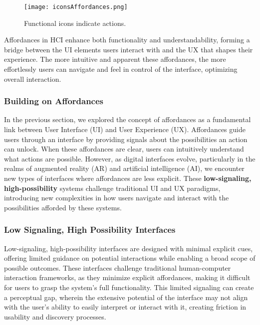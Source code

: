 \begin{figure}[h]
    \centering
    \texttt{[image: iconsAffordances.png]}
    \caption{Functional icons indicate actions.}
    \vspace{0.1cm}
    \label{fig:affordances}
\end{figure}

Affordances in HCI enhance both functionality and understandability, forming a bridge between the UI elements users interact with and the UX that shapes their experience.
The more intuitive and apparent these affordances, the more effortlessly users can navigate and feel in control of the interface, optimizing overall interaction.

\subsubsection{Building on Affordances}

In the previous section, we explored the concept of affordances as a fundamental link between User Interface (UI) and User Experience (UX).
Affordances guide users through an interface by providing signals about the possibilities an action can unlock\cite{10.20380/gi2000.24}\cite{10.1177/1086026618803729}.
When these affordances are clear, users can intuitively understand what actions are possible.
However, as digital interfaces evolve, particularly in the realms of augmented reality (AR) and artificial intelligence (AI), we encounter new types of interfaces where affordances are less explicit.
These \textbf{low-signaling, high-possibility} systems challenge traditional UI and UX paradigms, introducing new complexities in how users navigate and interact with the possibilities afforded by these systems.

\subsubsection{ Low Signaling, High Possibility Interfaces}

Low-signaling, high-possibility interfaces are designed with minimal explicit cues, offering limited guidance on potential interactions while enabling a broad scope of possible outcomes.
These interfaces challenge traditional human-computer interaction frameworks, as they minimize explicit affordances, making it difficult for users to grasp the system's full functionality.
This limited signaling can create a perceptual gap, wherein the extensive potential of the interface may not align with the user's ability to easily interpret or interact with it, creating friction in usability and discovery processes.

